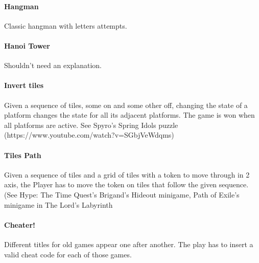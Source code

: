 
\paragraph{Hangman} Classic hangman with letters attempts.

\paragraph{Hanoi Tower} Shouldn't need an explanation.

\paragraph{Invert tiles} Given a sequence of tiles, some on and some other off, changing the state of a platform changes the state for all its adjacent platforms. The game is won when all platforms are active. See Spyro's Spring Idols puzzle (https://www.youtube.com/watch?v=SGbjVeWdqms)


\paragraph{Tiles Path} Given a sequence of tiles and a grid of tiles with a token to move through in 2 axis, the Player has to move the token on tiles that follow the given sequence. (See Hype: The Time Quest's Brigand's Hideout minigame, Path of Exile's minigame in The Lord's Labyrinth


\paragraph{Cheater!} Different titles for old games appear one after another. The play has to insert a valid cheat code for each of those games.


\pagebreak
